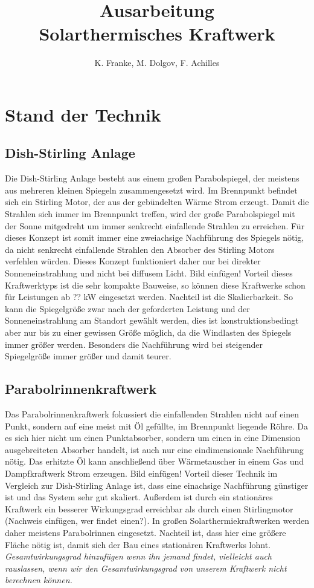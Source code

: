 \documentclass[fontsize=10pt,paper=a4,bibliography=totoc]{scrartcl}
\title{Ausarbeitung\\Solarthermisches Kraftwerk}
\author{K. Franke, M. Dolgov, F. Achilles}
\begin{document}
\maketitle

\section{Stand der Technik}
\subsection{Dish-Stirling Anlage}
Die Dish-Stirling Anlage besteht aus einem großen Parabolspiegel, der meistens aus mehreren kleinen Spiegeln zusammengesetzt wird. Im Brennpunkt befindet sich ein Stirling Motor, der aus der gebündelten Wärme Strom erzeugt. Damit die Strahlen sich immer im Brennpunkt treffen, wird der große Parabolspiegel mit der Sonne mitgedreht um immer senkrecht einfallende Strahlen zu erreichen. Für dieses Konzept ist somit immer eine zweiachsige Nachführung des Spiegels nötig, da nicht senkrecht einfallende Strahlen den Absorber des Stirling Motors verfehlen würden. Dieses Konzept funktioniert daher nur bei direkter Sonneneinstrahlung und nicht bei diffusem Licht. Bild einfügen! Vorteil dieses Kraftwerktyps ist die sehr kompakte Bauweise, so können diese Kraftwerke schon für Leistungen ab ??
 kW eingesetzt werden. Nachteil ist die Skalierbarkeit. So kann die Spiegelgröße zwar nach der geforderten Leistung und der Sonneneinstrahlung am Standort gewählt werden, dies ist konstruktionsbedingt aber nur bis zu einer gewissen Größe möglich, da die Windlasten des Spiegels immer größer werden. Besonders die Nachführung wird bei steigender Spiegelgröße immer größer und damit teurer.
 
\subsection{Parabolrinnenkraftwerk}
Das Parabolrinnenkraftwerk fokussiert die einfallenden Strahlen nicht auf einen Punkt, sondern auf eine meist mit Öl gefüllte, im Brennpunkt liegende Röhre. Da es sich hier nicht um einen Punktabsorber, sondern um einen in eine Dimension ausgebreiteten Absorber handelt, ist auch nur eine eindimensionale Nachführung nötig. Das erhitzte Öl kann anschließend über Wärmetauscher in einem Gas und Dampfkraftwerk Strom erzeugen. Bild einfügen! Vorteil dieser Technik im Vergleich zur Dish-Stirling Anlage ist, dass eine einachsige Nachführung günstiger ist und das System sehr gut skaliert. Außerdem ist durch ein stationäres Kraftwerk ein besserer Wirkungsgrad erreichbar als durch einen Stirlingmotor
 (Nachweis einfügen, wer findet einen?). In großen Solarthermiekraftwerken werden daher meistens Parabolrinnen eingesetzt. Nachteil ist, dass hier eine größere Fläche nötig ist, damit sich der Bau eines stationären Kraftwerks lohnt.
\emph{Gesamtwirkungsgrad hinzufügen wenn ihn jemand findet, vielleicht auch rauslassen, wenn wir den Gesamtwirkungsgrad von unserem Kraftwerk nicht berechnen können.}
\end{document}
